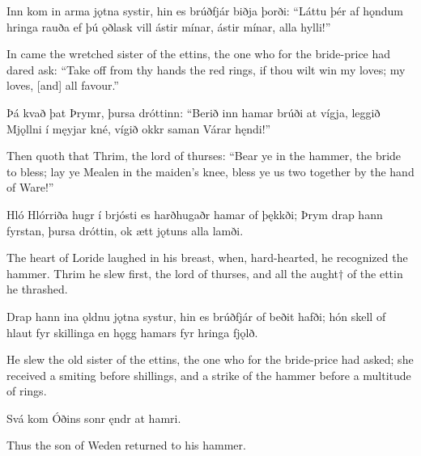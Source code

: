 Inn kom in arma \hld jǫtna systir,
hin es brúðfjár \hld biðja þorði:
“Láttu þér af hǫndum \hld hringa rauða
ef þú ǫðlask vill \hld ástir mínar,
ástir mínar, \hld alla hylli!”

In came the wretched sister of the ettins, the one who for the bride-price had dared ask: “Take off from thy hands the red rings, if thou wilt win my loves; my loves, [and] all favour.”\footnotemark[1]

Þá kvað þat Þrymr, \hld þursa dróttinn:
“Berið inn hamar \hld brúði at vígja,
leggið Mjǫllni \hld í męyjar kné,
vígið okkr saman \hld Várar hęndi!”

Then quoth that Thrim, the lord of thurses: “Bear ye in the hammer, the bride to bless; lay ye Mealen in the maiden’s knee, bless ye us two together by the hand of Ware\footnotemark[1]!”

Hló Hlórriða \hld hugr í brjósti
es harðhugaðr \hld hamar of þękkði;
Þrym drap hann fyrstan, \hld þursa dróttin,
ok ætt jǫtuns \hld alla lamði. 

The heart of Loride laughed in his breast, when, hard-hearted, he recognized the hammer. Thrim he slew first, the lord of thurses, and all the aught† of the ettin he thrashed.

Drap hann ina ǫldnu \hld jǫtna systur,
hin es brúðfjár \hld of beðit hafði;
hón skell of hlaut \hld fyr skillinga
en hǫgg hamars \hld fyr hringa fjǫlð.

He slew the old sister of the ettins, the one who for the bride-price had asked; she received a smiting before shillings, and a strike of the hammer before a multitude of rings.

Svá kom Óðins sonr \hld ęndr at hamri. 

Thus the son of Weden returned to his hammer.
